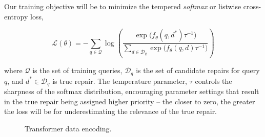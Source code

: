 \documentclass[sigplan,review,acmsmall,nonacm,screen,anonymous]{acmart}\settopmatter{printfolios=false,printccs=false,printacmref=false}
\begin{document}
\noindent Our training objective will be to minimize the tempered \textit{softmax} or listwise cross-entropy loss,

\begin{equation}
\mathcal{L}(\theta) = -\sum_{q \in \mathcal{Q}} \log \left( \frac{\exp\big(f_\theta(q, d^*)\tau^{-1}\big)}{\sum_{d \in \mathcal{D}_q} \exp\big(f_\theta(q, d)\tau^{-1}\big)} \right)
\end{equation}

\noindent where $\mathcal{Q}$ is the set of training queries, $\mathcal{D}_q$ is the set of candidate repairs for query $q$, and $d^* \in \mathcal{D}_q$ is true repair. The temperature parameter, $\tau$ controls the sharpness of the softmax distribution, encouraging parameter settings that result in the true repair being assigned higher priority -- the closer to zero, the greater the loss will be for underestimating the relevance of the true repair.


\begin{figure}
\caption{Transformer data encoding.}\label{fig:tx_data_encoding}
\end{figure}
\end{document}
